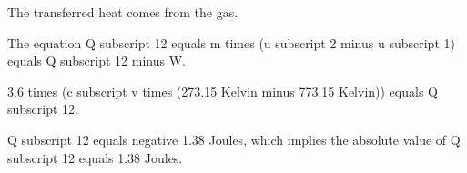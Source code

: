 The transferred heat comes from the gas.

The equation Q subscript 12 equals m times (u subscript 2 minus u subscript 1) equals Q subscript 12 minus W.

3.6 times (c subscript v times (273.15 Kelvin minus 773.15 Kelvin)) equals Q subscript 12.

Q subscript 12 equals negative 1.38 Joules, which implies the absolute value of Q subscript 12 equals 1.38 Joules.